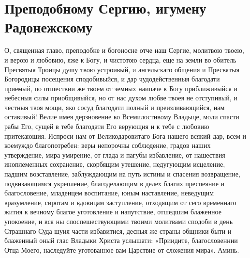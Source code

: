 \section{Преподобному Сергию, игумену Радонежскому}\begin{mymulticols}




О, священная главо, преподобне и богоносне отче наш Сергие, молитвою твоею, и верою и любовию, яже к Богу, и чистотою сердца, еще на земли во обитель Пресвятыя Троицы душу твою устроивый, и ангельскаго общения и Пресвятыя Богородицы посещения сподобивыйся, и дар чудодейственныя благодати приемый, по отшествии же твоем от земных наипаче к Богу приближивыйся и небесныя силы приобщивыйся, но от нас духом любве твоея не отступивый, и честныя твоя мощи, яко сосуд благодати полный и преизливающийся, нам оставивый! Велие имея дерзновение ко Всемилостивому Владыце, моли спасти рабы Его, сущей в тебе благодати Его верующия и к тебе с любовию притекающия. Испроси нам от Великодаровитаго Бога нашего всякий дар, всем и коемуждо благопотребен: веры непорочны соблюдение, градов наших утверждение, мира умирение, от глада и пагубы избавление, от нашествия иноплеменных сохранение, скорбящим утешение, недугующим исцеление, падшим возставление, заблуждающим на путь истины и спасения возвращение, подвизающимся укрепление, благоделающим в делех благих преспеяние и благословение, младенцем воспитание, юным наставление, неведущим вразумление, сиротам и вдовицам заступление, отходящим от сего временнаго жития к вечному благое уготовление и напутствие, отшедшим блаженное упокоение, и вся ны споспешествующими твоими молитвами сподоби в день Страшнаго Суда шуия части избавитися, десныя же страны общники быти и блаженный оный глас Владыки Христа услышати: «Приидите, благословеннии Отца Моего, наследуйте уготованное вам Царствие от сложения мира». Аминь.

\end{mymulticols}

